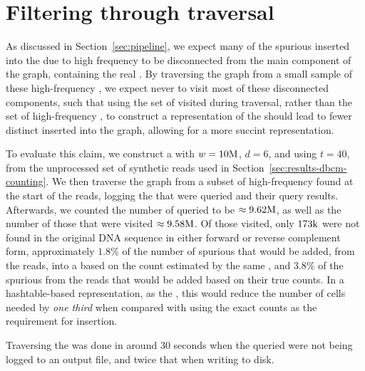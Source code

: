 \section{Filtering through traversal}
\label{sec:results-dbcm-traversal}

As discussed in Section~\ref{sec:pipeline}, we expect many of the spurious  inserted into the \dBG due to high frequency to be disconnected from the main component of the graph, containing the real . By traversing the graph from a small sample of these high-frequency , we expect never to visit most of these disconnected components, such that using the set of  visited during traversal, rather than the set of high-frequency , to construct a representation of the \dBG should lead to fewer distinct  inserted into the graph, allowing for a more succint representation.

To evaluate this claim, we construct a \dBCM with $w = 10\mega$, $d = 6$, and using $t = 40$, from the unprocessed set of synthetic reads used in Section~\ref{sec:results-dbcm-counting}. We then traverse the graph from a subset of high-frequency  found at the start of the reads, logging the  that were queried and their query results. Afterwards, we counted the number of queried  to be $\approx 9.62\mega$, as well as the number of those that were visited $\approx 9.58\mega$. Of those visited, only $173\kilo$ were not found in the original DNA sequence in either forward or reverse complement form, approximately $1.8\%$ of the number of spurious  that would be added, from the reads, into a \dBG based on the count estimated by the same \dBCM, and $3.8\%$ of the spurious  from the reads that would be added based on their true counts. In a hashtable-based representation, as the \dBHT, this would reduce the number of cells needed by \emph{one third} when compared with using the exact counts as the requirement for insertion.

Traversing the \dBCM was done in around $30$ seconds when the queried  were not being logged to an output file, and twice that when writing to disk.

